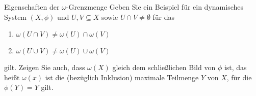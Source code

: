 \begin{uebung} Eigenschaften der $\omega$-Grenzmenge
  Geben Sie ein Beispiel für ein dynamisches System $(X, \phi)$ und $U, V \subseteq X$ sowie $U \cap V \neq \emptyset$ für das
  \renewcommand{\labelenumi}{(\alph{enumi})}
  \begin{enumerate}
  \item $\omega(U \cap V) \neq \omega(U) \cap \omega(V)$
  \item $\omega(U \cup V) \neq \omega(U) \cup \omega(V)$
  \end{enumerate}
gilt. Zeigen Sie auch, dass $\omega(X)$ gleich dem schließlichen Bild von $\phi$ ist, das heißt $\omega(x)$ ist die (bezüglich Inklusion) maximale Teilmenge $Y$ von $X$, für die $\phi(Y)= Y$ gilt.
\end{uebung}

